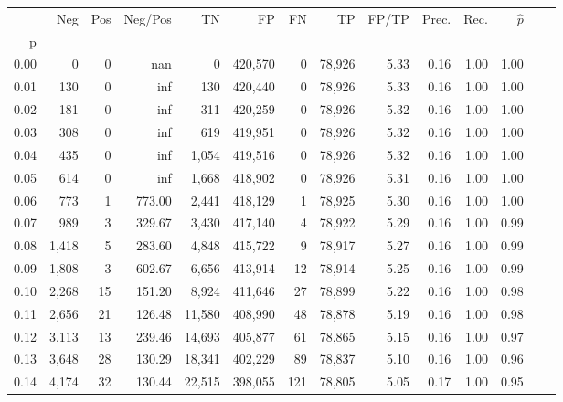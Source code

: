 \begin{tabular}{rrrrrrrrrrrrrr}
\toprule
{} &     Neg &    Pos & Neg/Pos &       TN &       FP &      FN &      TP & FP/TP & Prec. &  Rec. & $\hat{p}$ \\
p    &         &        &         &          &          &         &         &       &       &       &           \\
\midrule
0.00 &       0 &      0 &     nan &        0 &  420,570 &       0 &  78,926 &  5.33 &  0.16 &  1.00 &      1.00 \\
0.01 &     130 &      0 &     inf &      130 &  420,440 &       0 &  78,926 &  5.33 &  0.16 &  1.00 &      1.00 \\
0.02 &     181 &      0 &     inf &      311 &  420,259 &       0 &  78,926 &  5.32 &  0.16 &  1.00 &      1.00 \\
0.03 &     308 &      0 &     inf &      619 &  419,951 &       0 &  78,926 &  5.32 &  0.16 &  1.00 &      1.00 \\
0.04 &     435 &      0 &     inf &    1,054 &  419,516 &       0 &  78,926 &  5.32 &  0.16 &  1.00 &      1.00 \\
0.05 &     614 &      0 &     inf &    1,668 &  418,902 &       0 &  78,926 &  5.31 &  0.16 &  1.00 &      1.00 \\
0.06 &     773 &      1 &  773.00 &    2,441 &  418,129 &       1 &  78,925 &  5.30 &  0.16 &  1.00 &      1.00 \\
0.07 &     989 &      3 &  329.67 &    3,430 &  417,140 &       4 &  78,922 &  5.29 &  0.16 &  1.00 &      0.99 \\
0.08 &   1,418 &      5 &  283.60 &    4,848 &  415,722 &       9 &  78,917 &  5.27 &  0.16 &  1.00 &      0.99 \\
0.09 &   1,808 &      3 &  602.67 &    6,656 &  413,914 &      12 &  78,914 &  5.25 &  0.16 &  1.00 &      0.99 \\
0.10 &   2,268 &     15 &  151.20 &    8,924 &  411,646 &      27 &  78,899 &  5.22 &  0.16 &  1.00 &      0.98 \\
0.11 &   2,656 &     21 &  126.48 &   11,580 &  408,990 &      48 &  78,878 &  5.19 &  0.16 &  1.00 &      0.98 \\
0.12 &   3,113 &     13 &  239.46 &   14,693 &  405,877 &      61 &  78,865 &  5.15 &  0.16 &  1.00 &      0.97 \\
0.13 &   3,648 &     28 &  130.29 &   18,341 &  402,229 &      89 &  78,837 &  5.10 &  0.16 &  1.00 &      0.96 \\
0.14 &   4,174 &     32 &  130.44 &   22,515 &  398,055 &     121 &  78,805 &  5.05 &  0.17 &  1.00 &      0.95 \\

\end{tabular}
